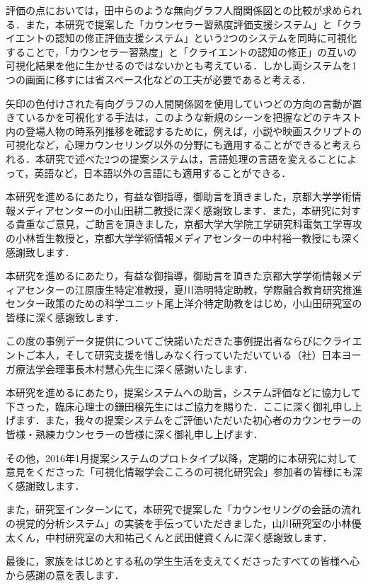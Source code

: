 \documentclass[shuuron]{kuee}
\begin{document}
評価の点においては，田中ら\cite{tanaka}のような無向グラフ人間関係図との比較が求められる．また，本研究で提案した「カウンセラー習熟度評価支援システム」と「クライエントの認知の修正評価支援システム」という2つのシステムを同時に可視化することで，「カウンセラー習熟度」と「クライエントの認知の修正」の互いの可視化結果を他に生かせるのではないかとも考えている．しかし両システムを1つの画面に移すには省スペース化などの工夫が必要であると考える．

矢印の色付けされた有向グラフの人間関係図を使用していつどの方向の言動が置きているかを可視化する手法は，このような新規のシーンを把握などのテキスト内の登場人物の時系列推移を確認するために，例えば，小説や映画スクリプトの可視化など，心理カウンセリング以外の分野にも適用することができると考えられる．本研究で述べた2つの提案システムは，言語処理の言語を変えることによって，英語など，日本語以外の言語にも適用することができる．


\begin{acknowledgements}

  本研究を進めるにあたり，有益な御指導，御助言を頂きました，京都大学学術情報メディアセンターの小山田耕二教授に深く感謝致します．また，本研究に対する貴重なご意見，ご助言を頂きました，京都大学大学院工学研究科電気工学専攻の小林哲生教授と，京都大学学術情報メディアセンターの中村裕一教授にも深く感謝致します．

  本研究を進めるにあたり，有益な御指導，御助言を頂きた京都大学学術情報メディアセンターの江原康生特定准教授，夏川浩明特定助教，学際融合教育研究推進センター政策のための科学ユニット尾上洋介特定助教をはじめ，小山田研究室の皆様に深く感謝致します．

  この度の事例データ提供についてご快諾いただきた事例提出者ならびにクライエントご本人，そして研究支援を惜しみなく行っていただいている（社）日本ヨーガ療法学会理事長木村慧心先生に深く感謝いたします．

  本研究を進めるにあたり，提案システムへの助言，システム評価などに協力して下さった，臨床心理士の鎌田穣先生にはご協力を賜りた．ここに深く御礼申し上げます．また，我々の提案システムをご評価いただいた初心者のカウンセラーの皆様・熟練カウンセラーの皆様に深く御礼申し上げます．

  その他，2016年1月提案システムのプロトタイプ以降，定期的に本研究に対して意見をくださった「可視化情報学会こころの可視化研究会」参加者の皆様にも深く感謝致します．

  また，研究室インターンにて，本研究で提案した「カウンセリングの会話の流れの視覚的分析システム」の実装を手伝っていただきました，山川研究室の小林優太くん，中村研究室の大和祐己くんと武田健資くんに深く感謝致します．





  最後に，家族をはじめとする私の学生生活を支えてくださったすべての皆様へ心から感謝の意を表します．
\end{acknowledgements}
\end{document}
